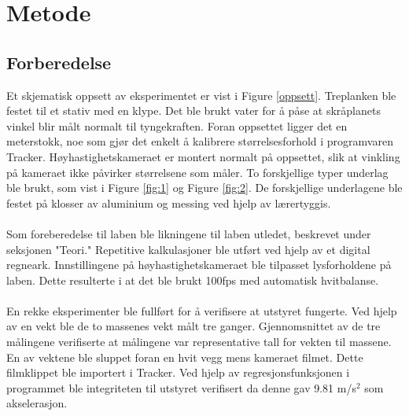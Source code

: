 \documentclass[10pt,a4paper]{report}
\begin{document}
\section*{Metode}
\subsection*{Forberedelse}
Et skjematisk oppsett av eksperimentet er vist i Figure \ref{oppsett}. Treplanken ble festet til et stativ med en klype. Det ble brukt vater for å påse at skråplanets vinkel blir målt normalt til tyngekraften. Foran oppsettet ligger det en meterstokk, noe som gjør det enkelt å kalibrere størrelsesforhold i programvaren Tracker. Høyhastighetskameraet er montert normalt på oppsettet, slik at vinkling på kameraet ikke påvirker størrelsene som måler. To forskjellige typer underlag ble brukt, som vist i Figure \ref{fig:1} og Figure \ref{fig:2}. De forskjellige underlagene ble festet på klosser av aluminium og messing ved hjelp av lærertyggis.\\
\\Som foreberedelse til laben ble likningene til laben utledet, beskrevet under seksjonen "Teori." Repetitive kalkulasjoner ble utført ved hjelp av et digital regneark. Innstillingene på høyhastighetskameraet ble tilpasset lysforholdene på laben. Dette resulterte i at det ble brukt 100fps med automatisk hvitbalanse.\\
\\En rekke eksperimenter ble fullført for å verifisere at utstyret fungerte. Ved hjelp av en vekt ble de to massenes vekt målt tre ganger. Gjennomsnittet av de tre målingene verifiserte at målingene var representative tall for vekten til massene. En av vektene ble sluppet foran en hvit vegg mens kameraet filmet. Dette filmklippet ble importert i Tracker. Ved hjelp av regresjonsfunksjonen i programmet ble integriteten til utstyret verifisert da denne gav 9.81 m/s$^2$ som akselerasjon.
\end{document}
